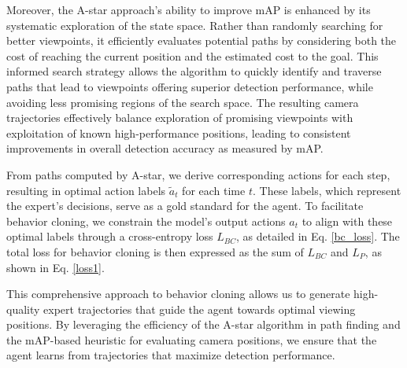 \documentclass[lettersize,journal]{IEEEtran}
\begin{document}
Moreover, the A-star approach's ability to improve mAP is enhanced by its systematic exploration of the state space.  Rather than randomly searching for better viewpoints, it efficiently evaluates potential paths by considering both the cost of reaching the current position and the estimated cost to the goal.  This informed search strategy allows the algorithm to quickly identify and traverse paths that lead to viewpoints offering superior detection performance, while avoiding less promising regions of the search space.  The resulting camera trajectories effectively balance exploration of promising viewpoints with exploitation of known high-performance positions, leading to consistent improvements in overall detection accuracy as measured by mAP.

From paths computed by A-star, we derive corresponding actions for each step, resulting in optimal action labels $\tilde{a}_t$ for each time $t$. These labels, which represent the expert's decisions, serve as a gold standard for the agent. To facilitate behavior cloning, we constrain the model's output actions ${a}_t$ to align with these optimal labels through a cross-entropy loss $L_{BC}$, as detailed in Eq. \ref{bc_loss}. The total loss for behavior cloning is then expressed as the sum of $L_{BC}$ and $L_{P}$, as shown in Eq. \ref{loss1}.

This comprehensive approach to behavior cloning allows us to generate high-quality expert trajectories that guide the agent towards optimal viewing positions. By leveraging the efficiency of the A-star algorithm in path finding and the mAP-based heuristic for evaluating camera positions, we ensure that the agent learns from trajectories that maximize detection performance.
\end{document}
